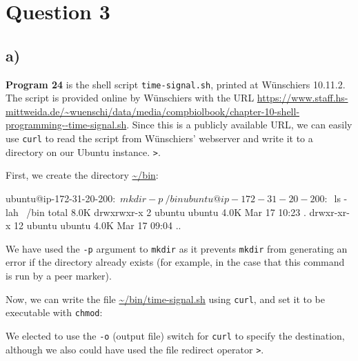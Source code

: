 \documentclass{article}
\begin{document}
\section{Question 3}

\subsection{a)}

\textbf{Program 24} is the shell script \texttt{time-signal.sh}, printed at Wünschiers 10.11.2. The script is provided online by Wünschiers with the URL
\url{https://www.staff.hs-mittweida.de/~wuenschi/data/media/compbiolbook/chapter-10-shell-programming--time-signal.sh}. Since this is a publicly available URL, we can easily use \texttt{curl} to read the script from Wünschiers' webserver and write it to a directory on our Ubuntu instance. \texttt{>}.

First, we create the directory \url{~/bin}:
\begin{bashinline}
ubuntu@ip-172-31-20-200:~$ mkdir -p ~/bin
ubuntu@ip-172-31-20-200:~$ ls -lah ~/bin
total 8.0K
drwxrwxr-x  2 ubuntu ubuntu 4.0K Mar 17 10:23 .
drwxr-xr-x 12 ubuntu ubuntu 4.0K Mar 17 09:04 ..
\end{bashinline}

We have used the \texttt{-p} argument to \texttt{mkdir} as it prevents \texttt{mkdir} from generating an error if the directory already exists (for example, in the case that this command is run by a peer marker).

Now, we can write the file \url{~/bin/time-signal.sh} using \texttt{curl}, and set it to be executable with \texttt{chmod}:


We elected to use the \texttt{-o} (output file) switch for \texttt{curl} to specify the destination, although we also could have used the file redirect operator \texttt{>}. 
\end{document}

